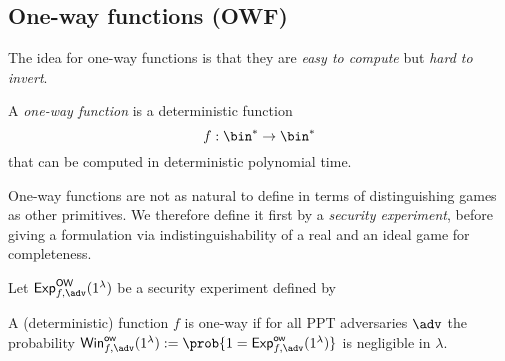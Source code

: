 \subsection{One-way functions (OWF)}
The idea for one-way functions is that they are \emph{easy to compute} but \emph{hard to invert}.

\begin{syntax}
	A \emph{one-way function} is a deterministic function
	\[f:\bin^*\rightarrow\bin^*\]
	that can be computed in deterministic polynomial time.
\end{syntax}

One-way functions are not as natural to define in terms of distinguishing games as other primitives. We therefore define it first by a \emph{security experiment}, before giving a formulation via indistinguishability of a real and an ideal game for completeness.

\begin{security}\label{secdef:owf}
	Let ${\mathsf{Exp}}_{f,\adv}^{\mathsf{OW}}(1^\lambda)$ be a security experiment defined by
	\begin{center}
	\end{center}
	A (deterministic) function $f$ is one-way if for all PPT adversaries $\adv$ the probability $\mathsf{Win}^{\mathsf{ow}}_{f,\adv}(1^\lambda):=\prob{1={\mathsf{Exp}}_{f,\adv}^{\mathsf{ow}}(1^\lambda)}$ is negligible in $\lambda$.
\end{security}

